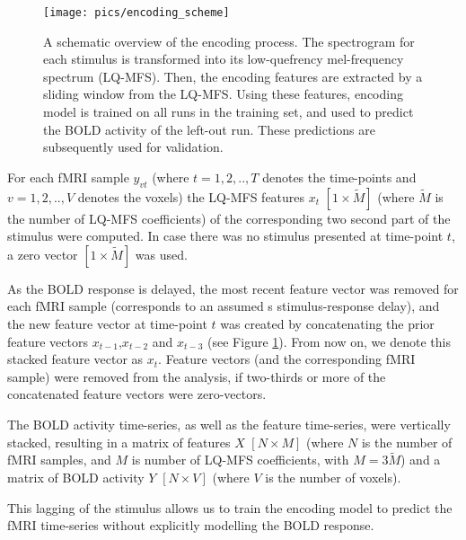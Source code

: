 \begin{figure}
  \centering
  \texttt{[image: pics/encoding\_scheme]}

  \caption{A schematic overview of the encoding process. The spectrogram for
    each stimulus is transformed into its low-quefrency mel-frequency spectrum
    (LQ-MFS). Then, the encoding features are extracted by a sliding window
    from the LQ-MFS. Using these features, encoding model is trained on all
    runs in the training set, and used to predict the BOLD activity of the
  left-out run.  These predictions are subsequently used for validation.}

 \label{fig:encoding_scheme}
\end{figure}


For each f{MRI} sample $y_{vt}$ (where $t=1,2,..,T$ denotes the time-points and
$v=1,2,..,V$ denotes the voxels) the LQ-MFS features $x_{t}$
$[1\times\widetilde{M}]$ (where $\widetilde{M}$ is the number of LQ-MFS
coefficients) of the corresponding two second part of the stimulus were
computed. In case there was no stimulus presented at time-point $t$, a zero
vector $[1\times\widetilde{M}]$ was used. 

As the BOLD response is delayed,  the most recent feature vector was removed
for each f{MRI} sample (corresponds to an assumed \unit[2]{s} stimulus-response
delay), and the new feature vector at time-point $t$ was created by
concatenating the prior feature vectors $x_{t-1}$,$x_{t-2}$ and $x_{t-3}$ (see
Figure \ref{fig:encoding_scheme}). From now on, we denote this stacked feature
vector as $x_{t}$.  Feature vectors (and the corresponding f{MRI} sample) were
removed from the analysis, if two-thirds or more of the concatenated feature
vectors were zero-vectors.

The BOLD activity time-series, as well as the feature time-series, were
vertically stacked, resulting in a matrix of features $X$ $[N\times M]$ (where
$N$ is the number of f{MRI} samples, and $M$ is number of LQ-MFS coefficients,
with $M=3\widetilde{M}$) and a matrix of BOLD activity $Y$ $[N\times V]$ (where
$V$ is the number of voxels).

This lagging of the stimulus allows us to train the encoding model to predict
the f{MRI} time-series without explicitly modelling the BOLD response.

